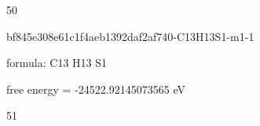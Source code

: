 \documentclass{article}
\begin{document}
50

\vspace{1cm}


bf845e308e61c1f4aeb1392daf2af740-C13H13S1-m1-1



formula: C13 H13 S1



free energy = -24522.92145073565 eV

51
\end{document}
